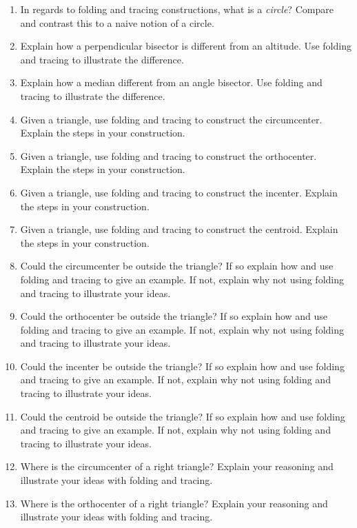 \begin{problems}
\begin{enumerate}
\item In regards to folding and tracing constructions, what is a \textit{circle}?
  Compare and contrast this to a naive notion of a circle.
\item Explain how a perpendicular bisector is different from an
  altitude. Use folding and tracing to illustrate the difference.
\item Explain how a median different from an angle bisector.  Use
  folding and tracing to illustrate the difference.
\item Given a triangle, use folding and tracing to construct the
  circumcenter. Explain the steps in your
  construction.
\item Given a triangle, use folding and tracing to construct the
  orthocenter. Explain the steps in your
  construction.
\item Given a triangle, use folding and tracing to construct the incenter. Explain
  the steps in your construction.
\item Given a triangle, use folding and tracing to construct the centroid. Explain
  the steps in your construction.
\item Could the circumcenter be outside the triangle? If so explain
  how and use folding and tracing to give an example. If not, explain why not
  using folding and tracing to illustrate your ideas.
\item Could the orthocenter be outside the triangle? If so explain how and
  use folding and tracing to give an example. If not, explain why not using
  folding and tracing to illustrate your ideas.
\item Could the incenter be outside the triangle? If so explain how
  and use folding and tracing to give an example. If not, explain why not using
  folding and tracing to illustrate your ideas.
\item Could the centroid be outside the triangle? If so explain how
  and use folding and tracing to give an example. If not, explain why not using
  folding and tracing to illustrate your ideas.
\item Where is the circumcenter of a right triangle? Explain your
  reasoning and illustrate your ideas with folding and tracing.
\item Where is the orthocenter of a right triangle?  Explain your
  reasoning and illustrate your ideas with folding and tracing.



\end{enumerate}
\end{problems}
